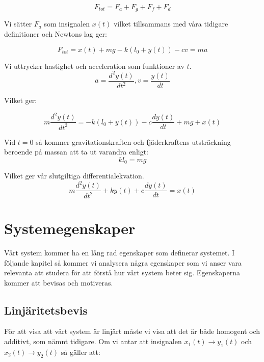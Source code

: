 \documentclass[10pt,a4paper]{article}
\begin{document}
\begin{equation}
F_{tot} = F_a + F_g + F_f + F_d
\end{equation}

Vi sätter $F_a$ som insignalen $x(t)$ vilket tillsammans med våra tidigare definitioner och Newtons lag ger:

\begin{equation}
F_{tot} = x(t) + mg - k(l_0+y(t)) - cv = ma
\end{equation}

Vi uttrycker hastighet och acceleration som funktioner av $t$.
\begin{equation}
a = \frac{d^2y(t)}{dt^2} , v = \frac{y(t)}{dt}
\end{equation}

Vilket ger:

\begin{equation}
 m\frac{d^2y(t)}{dt^2} =  -k(l_0 + y(t)) -c\frac{dy(t)}{dt} + mg +  x(t)
\end{equation}

Vid $t = 0$ så kommer gravitationskraften och fjäderkraftens utsträckning beroende på massan att ta ut varandra enligt:
\begin{equation}
k  l_0 = mg
\end{equation}

Vilket ger vår slutgiltiga differentialekvation.
\begin{equation}
 m\frac{d^2y(t)}{dt^2} + k  y(t) + c\frac{dy(t)}{dt} = x(t)
\end{equation}


\section{Systemegenskaper}

Vårt system kommer ha en lång rad egenskaper som definerar systemet. I följande kapitel så kommer vi analysera några egenskaper som vi anser vara relevanta att studera för att förstå hur vårt system beter sig. Egenskaperna kommer att bevisas och motiveras.

\subsection{Linjäritetsbevis}

För att visa att vårt system är linjärt måste vi visa att det är både homogent och additivt, som nämnt tidigare. Om vi antar att insignalen $x_1(t) \rightarrow y_1(t)$ och $x_2(t) \rightarrow y_2(t)$ så gäller att:
\end{document}
